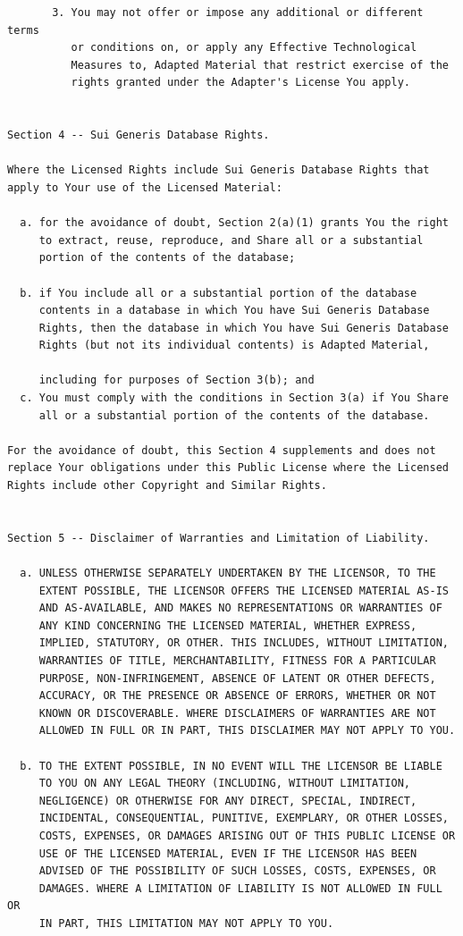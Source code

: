 \documentclass[12pt,spanish,]{article}
\begin{document}
\begin{verbatim}
       3. You may not offer or impose any additional or different terms
          or conditions on, or apply any Effective Technological
          Measures to, Adapted Material that restrict exercise of the
          rights granted under the Adapter's License You apply.


Section 4 -- Sui Generis Database Rights.

Where the Licensed Rights include Sui Generis Database Rights that
apply to Your use of the Licensed Material:

  a. for the avoidance of doubt, Section 2(a)(1) grants You the right
     to extract, reuse, reproduce, and Share all or a substantial
     portion of the contents of the database;

  b. if You include all or a substantial portion of the database
     contents in a database in which You have Sui Generis Database
     Rights, then the database in which You have Sui Generis Database
     Rights (but not its individual contents) is Adapted Material,

     including for purposes of Section 3(b); and
  c. You must comply with the conditions in Section 3(a) if You Share
     all or a substantial portion of the contents of the database.

For the avoidance of doubt, this Section 4 supplements and does not
replace Your obligations under this Public License where the Licensed
Rights include other Copyright and Similar Rights.


Section 5 -- Disclaimer of Warranties and Limitation of Liability.

  a. UNLESS OTHERWISE SEPARATELY UNDERTAKEN BY THE LICENSOR, TO THE
     EXTENT POSSIBLE, THE LICENSOR OFFERS THE LICENSED MATERIAL AS-IS
     AND AS-AVAILABLE, AND MAKES NO REPRESENTATIONS OR WARRANTIES OF
     ANY KIND CONCERNING THE LICENSED MATERIAL, WHETHER EXPRESS,
     IMPLIED, STATUTORY, OR OTHER. THIS INCLUDES, WITHOUT LIMITATION,
     WARRANTIES OF TITLE, MERCHANTABILITY, FITNESS FOR A PARTICULAR
     PURPOSE, NON-INFRINGEMENT, ABSENCE OF LATENT OR OTHER DEFECTS,
     ACCURACY, OR THE PRESENCE OR ABSENCE OF ERRORS, WHETHER OR NOT
     KNOWN OR DISCOVERABLE. WHERE DISCLAIMERS OF WARRANTIES ARE NOT
     ALLOWED IN FULL OR IN PART, THIS DISCLAIMER MAY NOT APPLY TO YOU.

  b. TO THE EXTENT POSSIBLE, IN NO EVENT WILL THE LICENSOR BE LIABLE
     TO YOU ON ANY LEGAL THEORY (INCLUDING, WITHOUT LIMITATION,
     NEGLIGENCE) OR OTHERWISE FOR ANY DIRECT, SPECIAL, INDIRECT,
     INCIDENTAL, CONSEQUENTIAL, PUNITIVE, EXEMPLARY, OR OTHER LOSSES,
     COSTS, EXPENSES, OR DAMAGES ARISING OUT OF THIS PUBLIC LICENSE OR
     USE OF THE LICENSED MATERIAL, EVEN IF THE LICENSOR HAS BEEN
     ADVISED OF THE POSSIBILITY OF SUCH LOSSES, COSTS, EXPENSES, OR
     DAMAGES. WHERE A LIMITATION OF LIABILITY IS NOT ALLOWED IN FULL OR
     IN PART, THIS LIMITATION MAY NOT APPLY TO YOU.


\end{verbatim}
\end{document}
